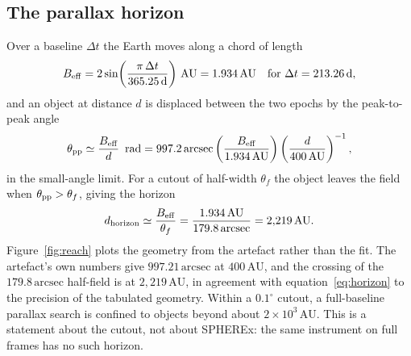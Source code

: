 \documentclass[11pt,a4paper]{article}
\newcommand{\unit}[1]{\,\mathrm{#1}}
\newcommand{\arcsec}{\unit{arcsec}}
\newcommand{\au}{\unit{AU}}
\begin{document}
\subsection{The parallax horizon}\label{sec:reach}
Over a baseline $\Delta t$ the Earth moves along a chord of length
\begin{equation}
B_{\rm eff} = 2\sin\!\left(\frac{\pi\,\Delta t}{365.25\unit{d}}\right)\au
= 1.934\au \quad\text{for } \Delta t = 213.26\unit{d},
\label{eq:chord}
\end{equation}
and an object at distance $d$ is displaced between the two epochs by the
peak-to-peak angle
\begin{equation}
\theta_{\rm pp} \simeq \frac{B_{\rm eff}}{d}\unit{\ rad}
= 997.2\arcsec \left(\frac{B_{\rm eff}}{1.934\au}\right)
\left(\frac{d}{400\au}\right)^{-1},
\label{eq:parallax}
\end{equation}
in the small-angle limit. For a cutout of half-width $\theta_f$ the object leaves
the field when $\theta_{\rm pp} > \theta_f$, giving the horizon
\begin{equation}
d_{\rm horizon} \simeq \frac{B_{\rm eff}}{\theta_f}
= \frac{1.934\au}{179.8\arcsec}
= 2{,}219\au .
\label{eq:horizon}
\end{equation}
Figure~\ref{fig:reach} plots the geometry from the artefact rather than the fit.
The artefact's own numbers give $997.21\arcsec$ at $400\au$, and the crossing of
the $179.8\arcsec$ half-field is at $2{,}219\au$, in agreement with
equation~\eqref{eq:horizon} to the precision of the tabulated geometry. Within a
$0.1^{\circ}$ cutout, a full-baseline parallax search is confined to objects
beyond about $2\times10^{3}\au$. This is a statement about the cutout, not about
SPHEREx: the same instrument on full frames has no such horizon.
\end{document}
